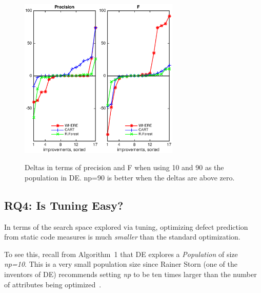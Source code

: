 \documentclass{sig-alternative}
\begin{document}
\begin{figure}[!b]
\begin{center}
\includegraphics[width=1.5in]{np_10_90_precision.eps}\includegraphics[width=1.5in]{np_10_90_f.eps}
 \end{center}
\caption{Deltas in terms of precision and F when using 10 and 90 as the population in DE. np=90 is better when the deltas are above zero.}\label{fig:deltas_np}
 \end{figure}


\subsection{RQ4: Is Tuning Easy?}\label{sect:easy}

In terms of the search space
explored via tuning, optimizing defect prediction from static code
measures is much {\em smaller} than the standard optimization.

To see this,
recall from Algorithm~1 that
DE explores a {\em Population} of size {\em np=10}. This is a very small population size since
Rainer Storn (one of the inventors of DE) recommends  setting {\em np} to be ten times larger than the number
of attributes being optimized~\cite{storn1997differential}.
\end{document}
